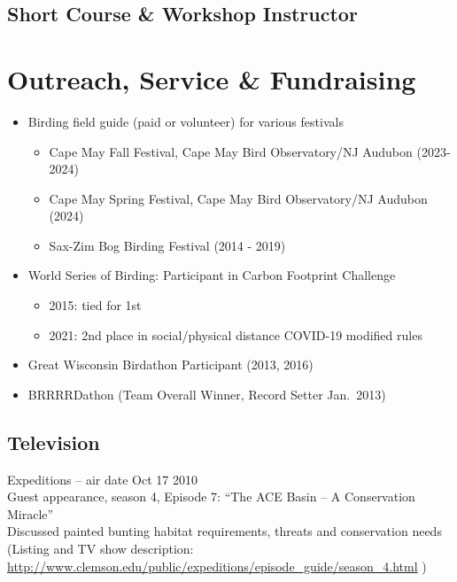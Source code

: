 \documentclass[11pt,a4paper,]{moderncv}
\providecommand{\tightlist}{%
	\setlength{\itemsep}{0pt}\setlength{\parskip}{0pt}}
\begin{document}
\subsection{Short Course \& Workshop
Instructor}\label{short-course-workshop-instructor}

\nopagebreak

\section{Outreach, Service \&
Fundraising}\label{outreach-service-fundraising}

\begin{itemize}
\tightlist
\item
  Birding field guide (paid or volunteer) for various festivals

  \begin{itemize}
  \tightlist
  \item
    Cape May Fall Festival, Cape May Bird Observatory/NJ Audubon
    (2023-2024)
  \item
    Cape May Spring Festival, Cape May Bird Observatory/NJ Audubon
    (2024)
  \item
    Sax-Zim Bog Birding Festival (2014 - 2019)
  \end{itemize}
\item
  World Series of Birding: Participant in Carbon Footprint Challenge

  \begin{itemize}
  \tightlist
  \item
    2015: tied for 1st
  \item
    2021: 2nd place in social/physical distance COVID-19 modified rules
  \end{itemize}
\item
  Great Wisconsin Birdathon Participant (2013, 2016)
\item
  BRRRRDathon (Team Overall Winner, Record Setter Jan.~2013)
\end{itemize}

\subsection{Television}\label{television}

Expeditions -- air date Oct 17 2010\\
Guest appearance, season 4, Episode 7: ``The ACE Basin -- A Conservation
Miracle''\\
Discussed painted bunting habitat requirements, threats and conservation
needs\\
(Listing and TV show description:\\
\url{http://www.clemson.edu/public/expeditions/episode_guide/season_4.html}
)
\end{document}
